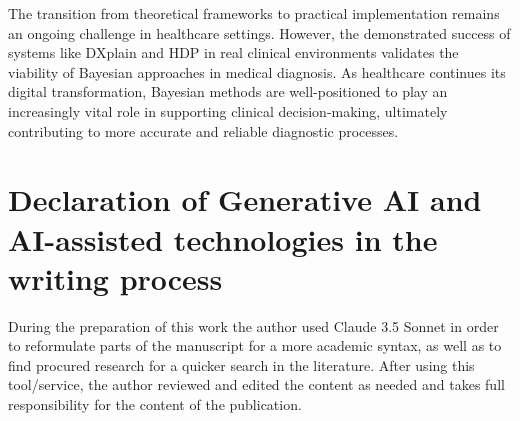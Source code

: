 \documentclass[3p,times,procedia]{elsarticle}
\begin{document}
The transition from theoretical frameworks to practical implementation remains an ongoing challenge in healthcare settings. However, the demonstrated success of systems like DXplain and HDP in real clinical environments validates the viability of Bayesian approaches in medical diagnosis. As healthcare continues its digital transformation, Bayesian methods are well-positioned to play an increasingly vital role in supporting clinical decision-making, ultimately contributing to more accurate and reliable diagnostic processes.

\section{Declaration of Generative AI and AI-assisted technologies in the writing process}
During the preparation of this work the author used Claude 3.5 Sonnet in order to 
reformulate parts of the manuscript for a more academic syntax, as well as 
to find procured research for a quicker search in the literature. After using this tool/service, the
author reviewed and edited the content as needed and takes full
responsibility for the content of the publication.

\footnotesize{
  
  
} 
\end{document}
